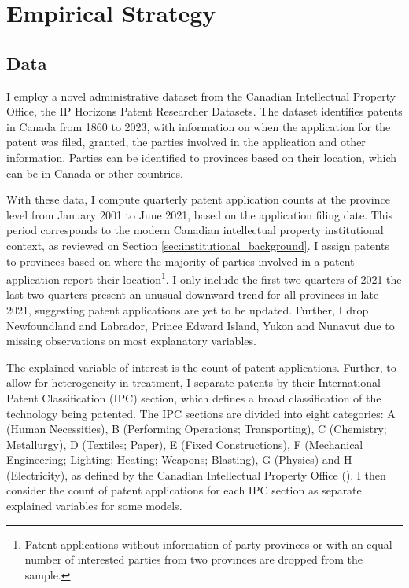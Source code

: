 \documentclass[../main.tex]{subfiles}
\begin{document}
\section{Empirical Strategy}
\label{sec:empirical_strategy}

\subsection{Data}

I employ a novel administrative dataset from the Canadian Intellectual Property Office, the IP Horizons Patent Researcher Datasets\nocite{canadianintellectualpropertyoffice23}. The dataset identifies patents in Canada from 1860 to 2023, with information on when the application for the patent was filed, granted, the parties involved in the application and other information. Parties can be identified to provinces based on their location, which can be in Canada or other countries. 


With these data, I compute quarterly patent application counts at the province level from January 2001 to June 2021, based on the application filing date. This period corresponds to the modern Canadian intellectual property institutional context, as reviewed on Section \ref{sec:institutional_background}. I assign patents to provinces based on where the majority of parties involved in a patent application report their location\footnote{Patent applications without information of party provinces or with an equal number of interested parties from two provinces are dropped from the sample.}. I only include the first two quarters of 2021 the last two quarters present an unusual downward trend for all provinces in late 2021, suggesting patent applications are yet to be updated. Further, I drop Newfoundland and Labrador, Prince Edward Island, Yukon and Nunavut due to missing observations on most explanatory variables. 


The explained variable of interest is the count of patent applications. Further, to allow for heterogeneity in treatment, I separate patents by their International Patent Classification (IPC) section, which defines a broad classification of the technology being patented. The IPC sections are divided into eight categories: A (Human Necessities), B (Performing Operations; Transporting), C (Chemistry; Metallurgy), D (Textiles; Paper), E (Fixed Constructions), F (Mechanical Engineering; Lighting; Heating; Weapons; Blasting), G (Physics) and H (Electricity), as defined by the Canadian Intellectual Property Office (\citeyear{canadianintellectualpropertyoffice23}). I then consider the count of patent applications for each IPC section as separate explained variables for some models.
\end{document}
